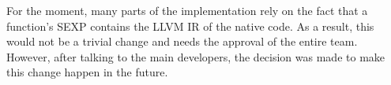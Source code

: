For the moment, many parts of the implementation rely on the fact that a function's SEXP  contains the LLVM IR of the native code. 
As a result, this would not be a trivial change and needs the approval of the entire team.
However, after talking to the main developers, the decision was made to make this change happen in the future.\\